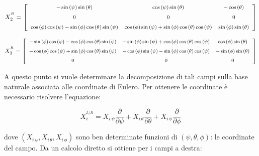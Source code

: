 \documentclass[11pt]{report}
\theoremstyle{plain}
\theoremstyle{definition}
\theoremstyle{remark}
\begin{document}
\begin{displaymath}\footnotesize
X_{2}^{^{R}} = \left[ \begin {array}{ccc} -\sin \left( \psi \right) \sin \left( \theta \right) &\cos \left( \psi \right) \sin \left( \theta \right) &-\cos \left( \theta \right) \\ \noalign{\medskip}0&0&0\\ \noalign{\medskip}\cos \left( \phi \right) \cos \left( \psi \right) -\sin \left( \phi \right) \cos \left( \theta \right) \sin \left( \psi \right) &\cos \left( \phi \right) \sin \left( \psi \right) +\sin \left( \phi \right) \cos \left( \theta \right) \cos \left( \psi \right) &\sin \left( \phi \right) \sin \left( \theta \right) \end {array} \right]
\end{displaymath}

\begin{displaymath}\footnotesize
X_{3}^{^{R}} = \left[ \begin {array}{ccc} -\sin \left( \phi \right) \cos \left( \psi \right) -\cos \left( \phi \right) \cos \left( \theta \right) \sin \left( \psi \right) &-\sin \left( \phi \right) \sin \left( \psi \right) +\cos \left( \phi \right) \cos \left( \theta \right) \cos \left( \psi \right) &\cos \left( \phi \right) \sin \left( \theta \right) \\ \noalign{\medskip}-\cos \left( \phi \right) \cos \left( \psi \right) +\sin \left( \phi \right) \cos \left( \theta \right) \sin \left( \psi \right) &-\cos \left( \phi \right) \sin \left( \psi \right) -\sin \left( \phi \right) \cos \left( \theta \right) \cos \left( \psi \right) &-\sin \left( \phi \right) \sin \left( \theta \right) \\ \noalign{\medskip}0&0&0\end {array} \right]
\end{displaymath}

A questo punto si vuole determinare la decomposizione di tali campi sulla base naturale associata alle coordinate di Eulero. Per ottenere le coordinate è necessario risolvere l'equazione:

\begin{displaymath}
X_{i}^{^{L/R}} = X_{i \, \psi}\dfrac{\partial}{\partial \psi} + X_{i \, \theta}\dfrac{\partial}{\partial \theta} + X_{i \, \phi}\dfrac{\partial}{\partial \phi}
\end{displaymath}

dove $(X_{i \, \psi} , X_{i \, \theta} , X_{i \, \phi} ) $ sono ben determinate funzioni di $(\psi, \theta, \phi)$: le coordinate del campo.
Da un calcolo diretto si ottiene per i campi a destra:
\end{document}

